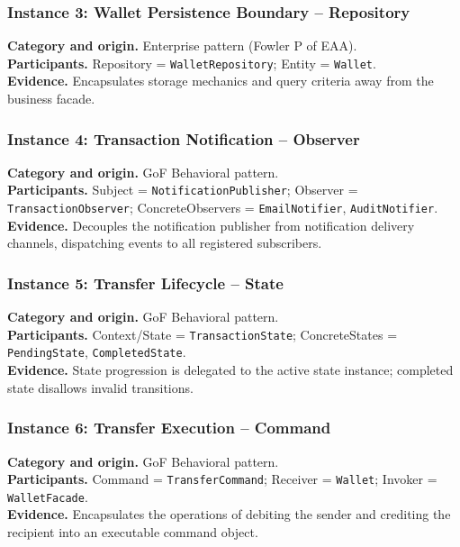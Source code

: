\documentclass[11pt,a4paper]{article}
\begin{document}
\subsubsection{Instance 3: Wallet Persistence Boundary -- Repository}
\textbf{Category and origin.} Enterprise pattern (Fowler P of EAA).\\
\textbf{Participants.} Repository = \texttt{WalletRepository}; Entity = \texttt{Wallet}.\\
\textbf{Evidence.} Encapsulates storage mechanics and query criteria away from the business facade.

\subsubsection{Instance 4: Transaction Notification -- Observer}
\textbf{Category and origin.} GoF Behavioral pattern.\\
\textbf{Participants.} Subject = \texttt{NotificationPublisher}; Observer = \texttt{TransactionObserver}; ConcreteObservers = \texttt{EmailNotifier}, \texttt{AuditNotifier}.\\
\textbf{Evidence.} Decouples the notification publisher from notification delivery channels, dispatching events to all registered subscribers.

\subsubsection{Instance 5: Transfer Lifecycle -- State}
\textbf{Category and origin.} GoF Behavioral pattern.\\
\textbf{Participants.} Context/State = \texttt{TransactionState}; ConcreteStates = \texttt{PendingState}, \texttt{CompletedState}.\\
\textbf{Evidence.} State progression is delegated to the active state instance; completed state disallows invalid transitions.

\subsubsection{Instance 6: Transfer Execution -- Command}
\textbf{Category and origin.} GoF Behavioral pattern.\\
\textbf{Participants.} Command = \texttt{TransferCommand}; Receiver = \texttt{Wallet}; Invoker = \texttt{WalletFacade}.\\
\textbf{Evidence.} Encapsulates the operations of debiting the sender and crediting the recipient into an executable command object.
\end{document}
